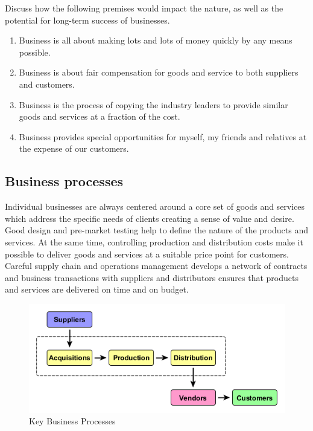 \documentclass[]{book}
\providecommand{\tightlist}{%
  \setlength{\itemsep}{0pt}\setlength{\parskip}{0pt}}
\begin{document}
Discuss how the following premises would impact the nature, as well as the potential for long-term success of businesses.

\begin{enumerate}
\def\labelenumi{\arabic{enumi}.}
\tightlist
\item
  Business is all about making lots and lots of money quickly by any means possible.
\item
  Business is about fair compensation for goods and service to both suppliers and customers.
\item
  Business is the process of copying the industry leaders to provide similar goods and services at a fraction of the cost.
\item
  Business provides special opportunities for myself, my friends and relatives at the expense of our customers.
\end{enumerate}

\hypertarget{business-processes}{%
\subsection{Business processes}\label{business-processes}}

Individual businesses are always centered around a core set of goods and services which address the specific needs of clients creating a sense of value and desire. Good design and pre-market testing help to define the nature of the products and services. At the same time, controlling production and distribution costs make it possible to deliver goods and services at a suitable price point for customers. Careful supply chain and operations management develops a network of contracts and business transactions with suppliers and distributors ensures that products and services are delivered on time and on budget.

\begin{figure}
\centering
\includegraphics{images/businessprocess.png}
\caption{Key Business Processes}
\end{figure}
\end{document}
